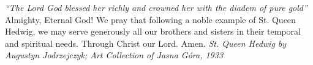 \pagestyle{empty}
\hspace{0pt}
\vfill

\textit{``The Lord God blessed her richly and crowned her with
the diadem of pure gold''}
\medbreak
Almighty, Eternal God! We pray that following a noble
example of St. Queen Hedwig, we may serve generously all our
brothers and sisters in their temporal and spiritual needs. Through
Christ our Lord. Amen.
\vfill
\textit{St. Queen Hedwig by Augustyn Jodrzejczyk; Art Collection of
Jasna Góra, 1933}
\hspace{0pt}
\newpage
